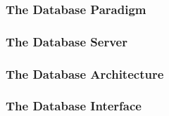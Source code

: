 \subsubsection{The Database Paradigm}


\subsubsection{The Database Server}


\subsubsection{The Database Architecture}


\subsubsection{The Database Interface}
\label{databaseInterface}
